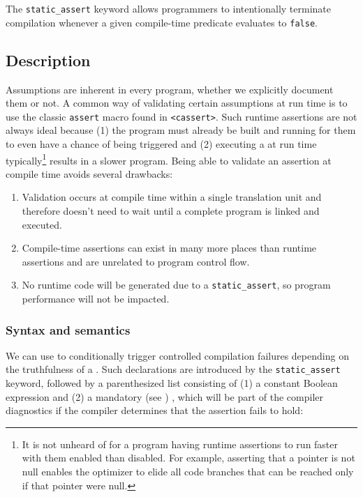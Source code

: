 
The \lstinline!static_assert! keyword allows programmers to intentionally terminate compilation whenever a given compile-time predicate
 evaluates to \lstinline!false!.

\subsection[Description]{Description}\label{description}

Assumptions are
inherent in every program, whether we explicitly document them or not. A common way of validating certain
assumptions at run time is to use the classic \lstinline!assert! macro found
in \lstinline!<cassert>!. Such runtime assertions are not always ideal
because (1) the program must already be built and running for them to
even have a chance of being triggered and (2) executing a
 at run time typically{\cprotect\footnote{It is
not unheard of for a program having runtime assertions to run faster with them
enabled than disabled. For example, asserting that a pointer is not
null enables the optimizer to elide all code branches that
  can be reached only if that pointer were null.}} results in a slower
program. Being able to validate an assertion at compile time avoids
several drawbacks:

\begin{enumerate}
\item{Validation occurs at compile time within a single translation unit and therefore doesn’t need to wait until a complete program is linked and executed.}
\item{Compile-time assertions can exist in many more places than runtime assertions and are unrelated to program control flow.}
\item{No runtime code will be generated due to a \lstinline!static_assert!, so program performance will not be impacted.}
\end{enumerate}

\subsubsection[Syntax and semantics]{Syntax and semantics}\label{syntax-and-semantics}

We can use  to conditionally trigger
controlled compilation failures depending on the truthfulness of a
. Such declarations are introduced by the
\lstinline!static_assert! keyword, followed by a parenthesized list
consisting of (1) a constant Boolean expression and (2) a mandatory (see
)
, which will be
part of the compiler diagnostics if the compiler determines that the
assertion fails to hold:


